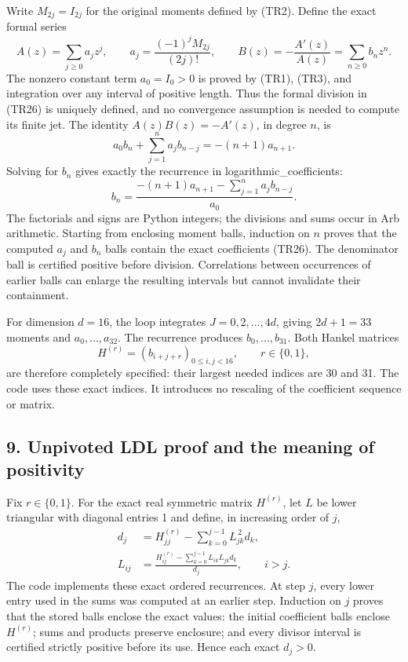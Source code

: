 Write \(M_{2j}=I_{2j}\) for the original moments defined by (TR2). Define the exact formal series \[
 A(z)=\sum_{j\geq0}a_jz^j,\qquad
 a_j=\frac{(-1)^jM_{2j}}{(2j)!},\qquad
 B(z)=-\frac{A'(z)}{A(z)}=\sum_{n\geq0}b_nz^n.
 \tag{TR26}
\] The nonzero constant term \(a_0=I_0>0\) is proved by (TR1), (TR3), and integration over any interval of positive length. Thus the formal division in (TR26) is uniquely defined, and no convergence assumption is needed to compute its finite jet. The identity \(A(z)B(z)=-A'(z)\), in degree \(n\), is \[
 a_0b_n+\sum_{j=1}^na_jb_{n-j}=-(n+1)a_{n+1}.
 \tag{TR27}
\] Solving for \(b_n\) gives exactly the recurrence in logarithmic\_coefficients: \[
 b_n=\frac{-(n+1)a_{n+1}-\sum_{j=1}^na_jb_{n-j}}{a_0}.
 \tag{TR28}
\] The factorials and signs are Python integers; the divisions and sums occur in Arb arithmetic. Starting from enclosing moment balls, induction on \(n\) proves that the computed \(a_j\) and \(b_n\) balls contain the exact coefficients (TR26). The denominator ball is certified positive before division. Correlations between occurrences of earlier balls can enlarge the resulting intervals but cannot invalidate their containment.

For dimension \(d=16\), the loop integrates \(J=0,2,\ldots,4d\), giving \(2d+1=33\) moments and \(a_0,\ldots,a_{32}\). The recurrence produces \(b_0,\ldots,b_{31}\). Both Hankel matrices \[
 H^{(r)}=(b_{i+j+r})_{0\leq i,j<16},\qquad r\in\{0,1\},
 \tag{TR29}
\] are therefore completely specified: their largest needed indices are 30 and 31. The code uses these exact indices. It introduces no rescaling of the coefficient sequence or matrix.

\subsection{9. Unpivoted LDL proof and the meaning of positivity}\label{C47stage:TR:unpivoted-ldl-proof-and-the-meaning-of-positivity}

Fix \(r\in\{0,1\}\). For the exact real symmetric matrix \(H^{(r)}\), let \(L\) be lower triangular with diagonal entries 1 and define, in increasing order of \(j\), \[
 \begin{aligned}
 d_j&=H^{(r)}_{jj}-\sum_{k=0}^{j-1}L_{jk}^{\,2}d_k,\\
 L_{ij}&=\frac{H^{(r)}_{ij}
 -\sum_{k=0}^{j-1}L_{ik}L_{jk}d_k}{d_j},
 \qquad i>j.
 \end{aligned}
 \tag{TR30}
\] The code implements these exact ordered recurrences. At step \(j\), every lower entry used in the sums was computed at an earlier step. Induction on \(j\) proves that the stored balls enclose the exact values: the initial coefficient balls enclose \(H^{(r)}\); sums and products preserve enclosure; and every divisor interval is certified strictly positive before its use. Hence each exact \(d_j>0\).

